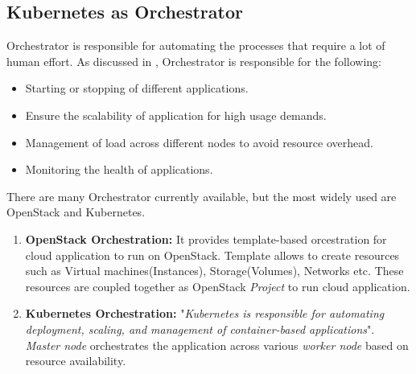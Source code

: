 \subsection{Kubernetes as Orchestrator}
\label{sec:k8s_orchestrator}
Orchestrator is responsible for automating the processes that require a lot of human effort. As discussed in \cite{containerjournal}, Orchestrator is responsible for the following:
\begin{itemize}
  \item Starting or stopping of different applications.
  \item Ensure the scalability of application for high usage demands.
  \item Management of load across different nodes to avoid resource overhead.
  \item Monitoring the health of applications.
\end{itemize}
There are many Orchestrator currently available, but the most widely used are OpenStack and Kubernetes.
\begin{enumerate}
  \item \textbf{OpenStack Orchestration:} It provides template-based orcestration for cloud application to run on OpenStack. Template allows to create resources such as Virtual machines(Instances), Storage(Volumes), Networks etc. These resources are coupled together as OpenStack \emph{Project} to run cloud application\cite{openstackOrchestrator}.
  \item \textbf{Kubernetes Orchestration:} "\emph{Kubernetes is responsible for automating deployment, scaling, and management of container-based applications}". \emph{Master node} orchestrates the application across various \emph{worker node} based on resource availability\cite{k8s}.
\end{enumerate}
